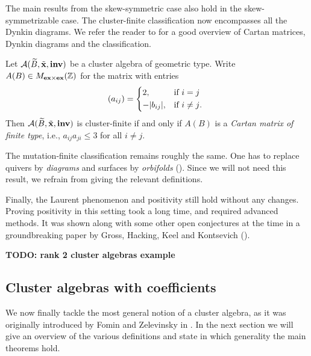 The main results from the skew-symmetric case also hold in the skew-symmetrizable case.
The cluster-finite classification now encompasses all the Dynkin diagrams. We refer the
reader to \cite[Chapter 5]{FominWilliams2021IntroductionCA_4-5} for a good overview of
Cartan matrices, Dynkin diagrams and the classification.
\begin{theorem}

	Let $\mathcal{A}(\widetilde{B}, \tilde{\mathbf{x}}, \mathbf{inv})$ be a cluster algebra of geometric type. Write $A(B) \in
		M_{\mathbf{ex} \times \mathbf{ex}}(\mathbb{Z})$ for the matrix with entries
	\begin{equation*}
		(a_{ij}) = \begin{dcases*}
			2,         & if $i = j$     \\
			-|b_{ij}|, & if $i \neq j$.
		\end{dcases*}
	\end{equation*}
	Then $\mathcal{A}(\widetilde{B}, \tilde{\mathbf{x}}, \mathbf{inv})$ is cluster-finite if and only if $A(B)$ is a \emph{Cartan
		matrix of finite type}, i.e., $a_{ij}a_{ji} \leq 3$ for all $i
		\neq j$.
\end{theorem}

The mutation-finite classification remains roughly the same. One has to replace quivers
by \emph{diagrams} and surfaces by \emph{orbifolds}
(\cite{FeliksonPavel2023cluster}). Since we will not need this result, we refrain from
giving the relevant definitions.

Finally, the Laurent phenomenon and positivity still hold without any changes. Proving
positivity in this setting took a long time, and required advanced methods. It was
shown along with some other open conjectures at the time in a groundbreaking paper by
Gross, Hacking, Keel and Kontsevich
(\cite{GrossHackingKeelKontsevich2018CanonicalBCA}).

\textbf{TODO: rank 2 cluster algebras example}

\subsection{Cluster algebras with coefficients}\label{sec:cluster_algebras_coefficients}

We now finally tackle the most general notion of a cluster algebra, as it was
originally introduced by Fomin and Zelevinsky in \cite{FominZelevinsky2002CAF}. In the
next section we will give an overview of the various definitions and state in which
generality the main theorems hold.

